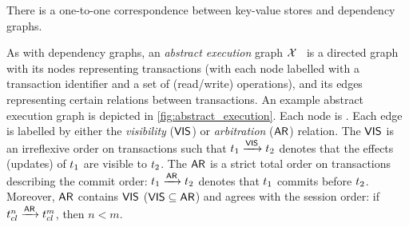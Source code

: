 \begin{theorem}
\label{thm:main-body-kv2graph}
\label{thm:dependency-graph-kv-store}
There is a one-to-one correspondence between key-value stores and dependency graphs.
\end{theorem}



As with dependency graphs, an \emph{abstract execution} graph $\mathcal{X}$~\cite{??} 
is a directed graph with its nodes representing transactions (with each node labelled with a transaction identifier and a set of (read/write) operations), 
and its edges representing certain relations between transactions. 
An example abstract execution graph is depicted in \cref{fig:abstract_execution}. 
Each node is . 
Each edge is labelled by either the \emph{visibility} ($\mathsf{VIS}$) or \emph{arbitration} ($\mathsf{AR}$) relation. 
The $\mathsf{VIS}$ is an irreflexive order on transactions such that $t_1 \xrightarrow{\mathsf{VIS}} t_2$ denotes that the effects (updates) of $t_1$ are visible to $t_2$. 
The $\mathsf{AR}$ is a strict total order on transactions describing the commit order:  $t_1 \xrightarrow{\mathsf{AR}} t_2$ denotes that $t_1$ commits before $t_2$. 
Moreover, $\mathsf{AR}$ contains $\mathsf{VIS}$ ($\mathsf{VIS} \subseteq \mathsf{AR}$) and agrees with the session order: 
if $t_{{cl}}^{n} \xrightarrow{\mathsf{AR}}  t_{{cl}}^{m}$, then $n < m$.


